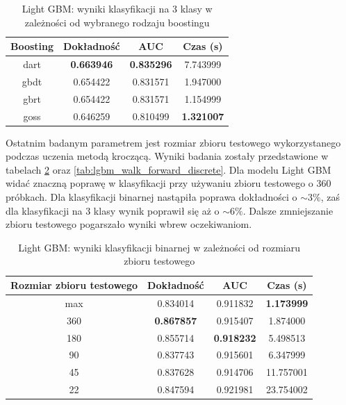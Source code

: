 \documentclass[a4paper, twoside, 11pt, openright]{article}
\begin{document}
\begin{table}[H]
    \centering
    \begin{tabular}{|c|c|c|c|}
    \hline
        \textbf{Boosting} & \textbf{Dokładność} & \textbf{AUC} & \textbf{Czas (s)} \\ \hline
dart     &  \textbf{0.663946} &  \textbf{0.835296} &    7.743999 \\ \hline
gbdt     &  0.654422 &  0.831571 &    1.947000 \\ \hline
gbrt     &  0.654422 &  0.831571 &    1.154999 \\ \hline
goss     &  0.646259 &  0.810499 &    \textbf{1.321007} \\ \hline
    \end{tabular}
    \caption{Light GBM: wyniki klasyfikacji na 3 klasy w zależności od wybranego rodzaju boostingu}
    \label{tab:lgbm_boosting_discrete}
\end{table}

Ostatnim badanym parametrem jest rozmiar zbioru testowego wykorzystanego podczas uczenia metodą kroczącą. Wyniki badania zostały przedstawione w tabelach \ref{tab:lgbm_walk_forward_binary} oraz \ref{tab:lgbm_walk_forward_discrete}. Dla modelu Light GBM widać znaczną poprawę w klasyfikacji przy używaniu zbioru testowego o 360 próbkach. Dla klasyfikacji binarnej nastąpiła poprawa dokładności o $\sim 3\%$, zaś dla klasyfikacji na 3 klasy wynik poprawił się aż o $\sim 6\%$. Dalsze zmniejszanie zbioru testowego pogarszało wyniki wbrew oczekiwaniom.

\begin{table}[H]
    \centering
    \begin{tabular}{|c|c|c|c|}
    \hline
        \textbf{Rozmiar zbioru testowego} & \textbf{Dokładność} & \textbf{AUC} & \textbf{Czas (s)} \\ \hline
max    &  0.834014 &  0.911832 &  \textbf{1.173999} \\ \hline
360                         &  \textbf{0.867857} &  0.915407 &   1.874000 \\ \hline
180                         &  0.855714 &  \textbf{0.918232} &    5.498513 \\ \hline
90                         &  0.837743 &  0.915601 &    6.347999 \\ \hline
45                          &  0.837628 &  0.914706 &   11.757001 \\ \hline
22                          &  0.847594 &  0.921981 &   23.754002 \\ \hline
    \end{tabular}
    \caption{Light GBM: wyniki klasyfikacji binarnej w zależności od rozmiaru zbioru testowego}
    \label{tab:lgbm_walk_forward_binary}
\end{table}
\end{document}
